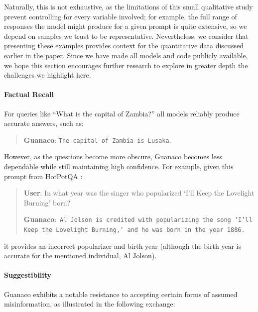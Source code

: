 Naturally, this is not exhaustive, as the limitations of this small qualitative study prevent controlling for every variable involved; for example, the full range of responses the model might produce for a given prompt is quite extensive, so we depend on samples we trust to be representative. Nevertheless, we consider that presenting these examples provides context for the quantitative data discussed earlier in the paper. Since we have made all models and code publicly available, we hope this section encourages further research to explore in greater depth the challenges we highlight here.  
\paragraph{Factual Recall} For queries like ``What is the capital of Zambia?'' all models reliably produce accurate answers, such as:

\begin{quote} 
    \textbf{Guanaco}:
    \texttt{The capital of Zambia is Lusaka.}
\end{quote}

However, as the questions become more obscure, {Guanaco} becomes less dependable while still maintaining high confidence. For example, given this prompt from HotPotQA \citep{yang2018hotpotqa}:

\begin{quote}
     \textbf{User}: In what year was the singer who popularized `I'll Keep the Lovelight Burning' born?  

     \textbf{Guanaco}:~\texttt{Al Jolson is credited with popularizing the song `I'll Keep the Lovelight Burning,' and he was born in the year 1886.}
 \end{quote}

it provides an incorrect popularizer and birth year (although the birth year is accurate for the mentioned individual, Al Jolson).

\paragraph{Suggestibility} {Guanaco} exhibits a notable resistance to accepting certain forms of assumed misinformation, as illustrated in the following exchange:

